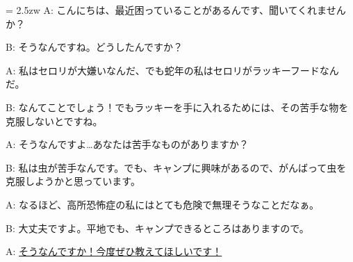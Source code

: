 \documentclass[11pt]{amsart}
\title{}
\author{}
\newenvironment{hangall}[1]{\hangindent = 2.5zw\everypar{\hangindent = 2.5zw}}{}
\begin{document}
\maketitle
\begin{hangall}{}%
A: こんにちは、最近困っていることがあるんです、聞いてくれませんか？

B: そうなんですね。どうしたんですか？

A: 私はセロリが大嫌いなんだ、でも蛇年の私はセロリがラッキーフードなんだ。

B: なんてことでしょう！でもラッキーを手に入れるためには、その苦手な物を克服しないとですね。

A: そうなんですよ…あなたは苦手なものがありますか？

B: 私は虫が苦手なんです。でも、キャンプに興味があるので、がんばって虫を克服しようかと思っています。

A: なるほど、高所恐怖症の私にはとても危険で無理そうなことだなぁ。

B: 大丈夫ですよ。平地でも、キャンプできるところはありますので。

A: \ul{そうなんですか！今度ぜひ教えてほしいです！}\end{hangall}
\end{document}
